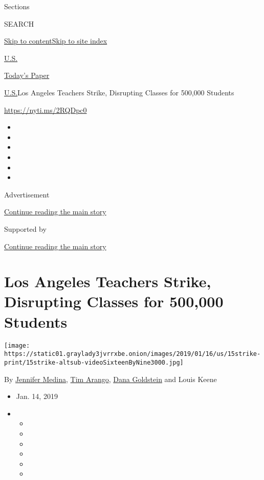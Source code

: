 Sections

SEARCH

\protect\hyperlink{site-content}{Skip to
content}\protect\hyperlink{site-index}{Skip to site index}

\href{https://www.nytimes3xbfgragh.onion/section/us}{U.S.}

\href{https://myaccount.nytimes3xbfgragh.onion/auth/login?response_type=cookie\&client_id=vi}{}

\href{https://www.nytimes3xbfgragh.onion/section/todayspaper}{Today's
Paper}

\href{/section/us}{U.S.}\textbar{}Los Angeles Teachers Strike,
Disrupting Classes for 500,000 Students

\url{https://nyti.ms/2RQDpc0}

\begin{itemize}
\item
\item
\item
\item
\item
\item
\end{itemize}

Advertisement

\protect\hyperlink{after-top}{Continue reading the main story}

Supported by

\protect\hyperlink{after-sponsor}{Continue reading the main story}

\hypertarget{los-angeles-teachers-strike-disrupting-classes-for-500000-students}{%
\section{Los Angeles Teachers Strike, Disrupting Classes for 500,000
Students}\label{los-angeles-teachers-strike-disrupting-classes-for-500000-students}}

\texttt{[image: https://static01.graylady3jvrrxbe.onion/images/2019/01/16/us/15strike-print/15strike-altsub-videoSixteenByNine3000.jpg]}

By \href{https://www.nytimes3xbfgragh.onion/by/jennifer-medina}{Jennifer
Medina}, \href{https://www.nytimes3xbfgragh.onion/by/tim-arango}{Tim
Arango},
\href{https://www.nytimes3xbfgragh.onion/by/dana-goldstein}{Dana
Goldstein} and Louis Keene

\begin{itemize}
\item
  Jan. 14, 2019
\item
  \begin{itemize}
  \item
  \item
  \item
  \item
  \item
  \item
  \end{itemize}
\end{itemize}

